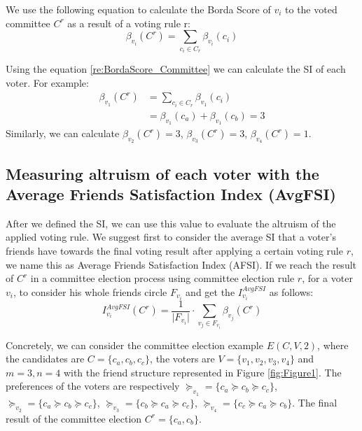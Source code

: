 \documentclass{article}
\begin{document}
We use the following equation to calculate the Borda Score of $v_i$ to the voted committee $C^{r}$ as a result of a voting rule r:
\begin{equation}
    \beta_{v_i}(C^{r}) = \sum_{c_i\in {C_{r}}}\beta_{v_i}(c_i)
\label{re:BordaScore_Committee}
\end{equation}

Using the equation \ref{re:BordaScore_Committee} we can calculate the SI of each voter. For example: 
\begin{equation*}
\begin{split}
     \beta_{v_1}(C^{r}) &= \sum_{c_i\in {C_{r}}}\beta_{v_1}(c_i)\\
                 &=\beta_{v_1}(c_a) + \beta_{v_1}(c_b)= 3
\end{split}\end{equation*}
Similarly, we can calculate $ \beta_{v_2}(C^{r}) = 3$, $ \beta_{v_3}(C^{r})=3$, $ \beta_{v_4}(C^{r})=1$. 

\subsection{Measuring altruism of each voter with the Average Friends Satisfaction Index (AvgFSI)}
After we defined the SI, we can use this value to evaluate the altruism of the applied voting rule. We suggest first to consider the average SI that a voter's friends have towards the final voting result after applying a certain voting rule $r$, we name this as Average Friends Satisfaction Index (AFSI). If we reach the result of $C^{r}$ in a committee election process using committee election rule $r$, for a voter $v_i$, to consider his whole friends circle $F_{v_i}$ and get the $I_{v_i}^{AvgFSI}$ as follows:  
\begin{equation}
     I_{v_i}^{AvgFSI}(C^{r}) = \frac{1}{\vert F_{v_i} \vert}\cdot \sum_{v_j\in {F_{v_i}}}  \beta_{v_j}(C^{r})   \label{si:AvgFSI}
\end{equation}

Concretely, we can consider the committee election example  $E(C,V,2)$,  where the candidates are $ C = \{c_a,c_b,c_c\}$, the voters are $V = \{v_1,v_2,v_3,v_4\}$  and $ m = 3, n = 4$ with the friend structure represented in Figure \ref{fig:Figure1}.  The preferences of the voters are respectively $\succeq_{v_1} =  \{c_a\succeq c_b \succeq c_c\}$,  $\succeq_{v_2} =  \{c_a\succeq c_b \succeq c_c\}$, $\succeq_{v_3} =  \{c_b\succeq c_a \succeq c_c\}$, $\succeq_{v_4} =  \{c_c\succeq c_a \succeq c_b\}$. The final result of the committee election $C^{r}= \{c_a, c_b\}$.
\end{document}
